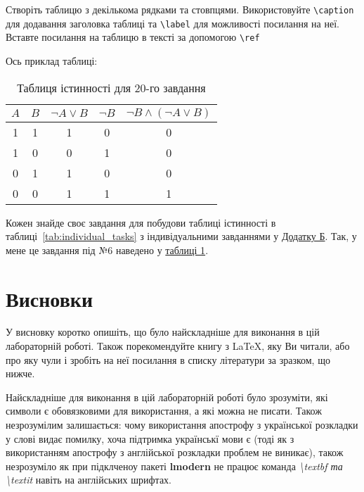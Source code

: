 	Створіть таблицю з декількома рядками та стовпцями. Використовуйте \texttt{\textbackslash caption} для додавання заголовка таблиці та \texttt{\textbackslash label} для можливості посилання на неї. Вставте посилання на таблицю в тексті за допомогою \texttt{\textbackslash ref}
	
	Ось приклад таблиці:
	
	
	\begin{table}[h]
		\centering
		\caption{Таблиця істинності для 20-го завдання} \label{sec:tabl_6}
		\label{tab:truth_table_20}
		\begin{tabular}{|c|c||c|c||c|}
			\hline
			\( A \) & \( B \) & \( \lnot A \lor B \) & \( \lnot B \) & \( \lnot B \land (\lnot A \lor B)  \) \\
			\hline
			\hline
			1 & 1 & 1 & 0 & 0 \\
			\hline
			1 & 0 & 0 & 1 & 0 \\
			\hline
			0 & 1 & 1 & 0 & 0\\
			\hline
			0 & 0 & 1 & 1 & 1 \\
			\hline
		\end{tabular}
	\end{table}
	
	
	
	Кожен знайде своє завдання для побудови таблиці істинності в таблиці~\ref{tab:individual_tasks} з індивідуальними завданнями у \hyperref[sec:appendix2]{Додатку Б}. Так, у мене це завдання під №6 наведено у  \hyperref[sec:tabl_6] {таблиці 1}.
	
	
	\section{Висновки}
	
	У висновку коротко опишіть, що було найскладніше для виконання в цій лабораторній роботі. 
	Також порекомендуйте книгу з LaTeX, яку Ви читали, або про яку чули і зробіть на неї посилання в списку літератури за зразком, що нижче.
	
	Найскладніше для виконання в цій лабораторній роботі було зрозуміти, які символи є обовязковими для використання, а які можна не писати. Також незрозумілим залишається: чому використання апострофу з української розкладки у слові видає помилку, хоча підтримка українськї мови є (тоді як з використанням апострофу з англійської розкладки проблем не виникає), також незрозуміло як при підклченоу пакеті \textbf{lmodern} не працює команда \textit{\textbackslash textbf та \textbackslash textit} навіть на англійських шрифтах.
	
